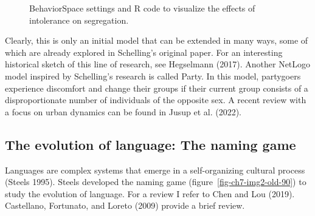 \documentclass[
  a4paper,
  DIV=11,
  numbers=noendperiod,
  oneside]{scrreprt}
\begin{document}
\begin{figure}


\caption{\label{fig-ch7-img1-old-89}BehaviorSpace settings and R code to
visualize the effects of intolerance on segregation.}

\end{figure}%

Clearly, this is only an initial model that can be extended in many
ways, some of which are already explored in Schelling's original paper.
For an interesting historical sketch of this line of research, see
Hegselmann (2017). Another NetLogo model inspired by Schelling's
research is called Party. In this model, partygoers experience
discomfort and change their groups if their current group consists of a
disproportionate number of individuals of the opposite sex. A recent
review with a focus on urban dynamics can be found in Jusup et al.
(2022).

\subsection{The evolution of language: The naming
game}\label{sec-The-evolution-of-language-The-naming-game}

Languages are complex systems that emerge in a self-organizing cultural
process (Steels 1995). Steels developed the naming game
(figure~\ref{fig-ch7-img2-old-90}) to study the evolution of language.
For a review I refer to Chen and Lou (2019). Castellano, Fortunato, and
Loreto (2009) provide a brief review.
\end{document}
